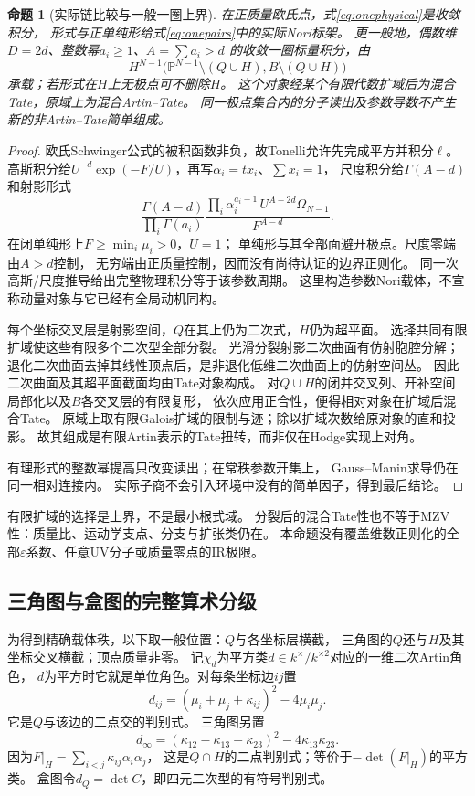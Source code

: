 \documentclass[11pt,a4paper]{ctexart}
\theoremstyle{cnplain}\newtheorem{theorem}{定理}[section]
\newtheorem{proposition}[theorem]{命题}
\theoremstyle{definition}\newtheorem{definition}[theorem]{定义}
\theoremstyle{remark}\newtheorem{remark}[theorem]{注}
\begin{document}
\begin{proposition}[实际链比较与一般一圈上界]\label{prop:onecarrier}
在正质量欧氏点，式\eqref{eq:onephysical}是收敛积分，
形式与正单纯形给式\eqref{eq:onepairs}中的实际Nori标架。
更一般地，偶数维$D=2d$、整数幂$a_i\ge1$、$A=\sum a_i>d$
的收敛一圈标量积分，由
\[
 H^{N-1}\bigl(\mathbb P^{N-1}\setminus(Q\cup H),
                    B\setminus(Q\cup H)\bigr)
\]
承载；若形式在$H$上无极点可不删除$H$。
这个对象经某个有限代数扩域后为混合Tate，原域上为混合Artin--Tate。
同一极点集合内的分子读出及参数导数不产生新的非Artin--Tate简单组成。
\end{proposition}
\begin{proof}
欧氏Schwinger公式的被积函数非负，故Tonelli允许先完成平方并积分$\ell$。
高斯积分给$U^{-d}\exp(-F/U)$，再写$\alpha_i=t x_i$、$\sum x_i=1$，
尺度积分给$\Gamma(A-d)$和射影形式
\[
 \frac{\Gamma(A-d)}{\prod_i\Gamma(a_i)}
 \frac{\prod_i\alpha_i^{a_i-1}\,U^{A-2d}\Omega_{N-1}}{F^{A-d}}.
\]
在闭单纯形上$F\ge\min_i\mu_i>0$，$U=1$；
单纯形与其全部面避开极点。尺度零端由$A>d$控制，
无穷端由正质量控制，因而没有尚待认证的边界正则化。
同一次高斯/尺度推导给出完整物理积分等于该参数周期。
这里构造参数Nori载体，不宣称动量对象与它已经有全局动机同构。

每个坐标交叉层是射影空间，$Q$在其上仍为二次式，$H$仍为超平面。
选择共同有限扩域使这些有限多个二次型全部分裂。
光滑分裂射影二次曲面有仿射胞腔分解；
退化二次曲面去掉其线性顶点后，是非退化低维二次曲面上的仿射空间丛。
因此二次曲面及其超平面截面均由Tate对象构成。
对$Q\cup H$的闭并交叉列、开补空间局部化以及$B$各交叉层的有限复形，
依次应用正合性，便得相对对象在扩域后混合Tate。
原域上取有限Galois扩域的限制与迹；除以扩域次数给原对象的直和投影。
故其组成是有限Artin表示的Tate扭转，而非仅在Hodge实现上对角。

有理形式的整数幂提高只改变读出；在常秩参数开集上，
Gauss--Manin求导仍在同一相对连接内。
实际子商不会引入环境中没有的简单因子，得到最后结论。
\end{proof}

有限扩域的选择是上界，不是最小根式域。
分裂后的混合Tate性也不等于MZV性：质量比、运动学支点、分支与扩张类仍在。
本命题没有覆盖维数正则化的全部$\varepsilon$系数、任意UV分子或质量零点的IR极限。

\subsection{三角图与盒图的完整算术分级}
为得到精确载体秩，以下取一般位置：$Q$与各坐标层横截，
三角图的$Q$还与$H$及其坐标交叉横截；顶点质量非零。
记$\chi_d$为平方类$d\in k^\times/k^{\times2}$对应的一维二次Artin角色，
$d$为平方时它就是单位角色。对每条坐标边$ij$置
\begin{equation}\label{eq:edgedisc}
 d_{ij}=(\mu_i+\mu_j+\kappa_{ij})^2-4\mu_i\mu_j .
\end{equation}
它是$Q$与该边的二点交的判别式。
三角图另置
\[
 d_\infty=(\kappa_{12}-\kappa_{13}-\kappa_{23})^2
                          -4\kappa_{13}\kappa_{23}.
\]
因为$F|_H=\sum_{i<j}\kappa_{ij}\alpha_i\alpha_j$，
这是$Q\cap H$的二点判别式；等价于$-\det(F|_H)$的平方类。
盒图令$d_Q=\det C$，即四元二次型的有符号判别式。
\end{document}
